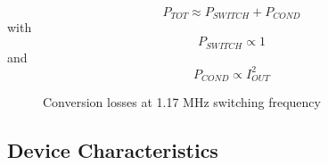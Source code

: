 \begin{equation}
    P_{TOT} \approx P_{SWITCH} + P_{COND}
\end{equation}
\label{eq:PLoss}
with
\begin{equation*}
   P_{SWITCH} \propto 1
\end{equation*}
and 
\begin{equation*}
	P_{COND} \propto I_{OUT}^2
\end{equation*}

\begin{figure}[h]
    \centering
    
    \caption{Conversion losses at 1.17 MHz switching frequency}
    \label{fig:losses}
\end{figure}

\subsection{Device Characteristics}
\label{sec:characteristics}

